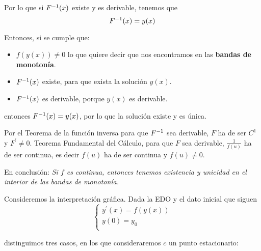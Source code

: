 Por lo que si $F^{-1}(x)$ existe y es derivable, tenemos que $$F^{-1}(x) = y(x)$$

Entonces, si se cumple que:
\begin{itemize}
\item $f(y(x))\neq 0$ lo que quiere decir que nos encontramos en las \textbf{bandas de monotonía}.
\item $F^{-1} (x)$ existe, para que exista la solución $y(x)$.
\item $F^{-1} (x)$ es derivable, porque $y(x)$ es derivable. 
\end{itemize}
entonces $F^{-1}(x) = y(x)$, por lo que la solución existe y es única.

Por el Teorema de la función inversa para que $F^{-1}$ sea derivable, $F$ ha de ser $C^1$ y $F^\prime\neq 0$. Teorema Fundamental del Cálculo, para que $F$ sea derivable, $\frac{1}{f(u)}$ ha de ser continua, es decir $f(u)$ ha de ser continua y $f(u)\neq 0$.

En conclusión:
\textit{Si $f$ es continua, entonces tenemos existencia y unicidad en el interior de las bandas de monotonía.}

Consideremos la interpretación gráfica. Dada la EDO y el dato inicial que siguen 
\begin{equation*}
  \left\lbrace
  \begin{array}{l}
     y^\prime(x) = f(y(x)) \\
     y(0) = y_0  \\
  \end{array}
  \right.
\end{equation*}

distinguimos tres casos, en los que consideraremos $c$ un punto estacionario:


